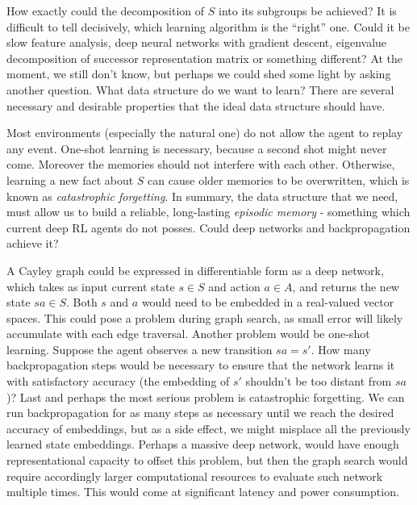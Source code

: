\documentclass[12pt]{article}
\begin{document}
How exactly could the decomposition of $S$ into its subgroups be achieved? It is difficult to tell decisively, which learning algorithm is the ``right'' one. Could it be slow feature analysis, deep neural networks with gradient descent, eigenvalue decomposition of successor representation matrix or something different?  At the moment, we still don't know, but perhaps we could shed some light by asking another question. What data structure do we want to learn? There are several necessary and desirable properties that the ideal data structure should have.

Most environments (especially the natural one) do not allow the agent to replay any event. One-shot learning is necessary, because a second shot might never come.  Moreover the memories should not interfere with each other. Otherwise, learning a new fact about $S$ can cause older memories to be overwritten, which is known as \textit{catastrophic forgetting}. In summary, the data structure that we need, must allow us to build a reliable, long-lasting \textit{episodic memory} - something which current deep RL agents do not posses. Could deep networks and backpropagation achieve it? 

A Cayley graph could be expressed in differentiable form as a deep network, which takes as input current state $s\in S$ and action $a\in A$, and returns the new state $sa\in S$.  Both $s$ and $a$ would need to be embedded in a real-valued vector spaces. This could pose a problem during graph search, as small error will likely accumulate with each edge traversal. Another problem would be one-shot learning. Suppose the agent observes a new transition $sa=s'$. How many backpropagation steps would be necessary to ensure that the network learns it with satisfactory accuracy (the embedding of $s'$ shouldn't be too distant from $sa$)? Last and perhaps the most serious problem is catastrophic forgetting. We can run backpropagation for as many steps as necessary until we reach the desired accuracy of embeddings, but as a side effect, we might misplace all the previously learned state embeddings. Perhaps a massive deep network, would have enough representational capacity to offset this problem, but then the graph search would require accordingly larger computational resources to evaluate such network multiple times. This would come at significant latency and power consumption. 
\end{document}
